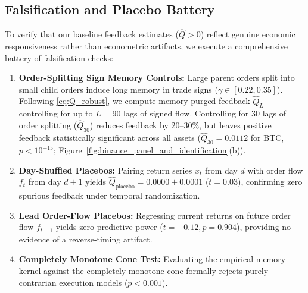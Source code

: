 \documentclass[12pt]{article}
\theoremstyle{definition}
\theoremstyle{remark}
\begin{document}
\subsection{Falsification and Placebo Battery}
To verify that our baseline feedback estimates ($\hat{Q} > 0$) reflect genuine economic responsiveness rather than econometric artifacts, we execute a comprehensive battery of falsification checks:

\begin{enumerate}[noitemsep,topsep=1pt]
    \item \textbf{Order-Splitting Sign Memory Controls:} Large parent orders split into small child orders induce long memory in trade signs ($\gamma \in [0.22, 0.35]$). Following \eqref{eq:Q_robust}, we compute memory-purged feedback $\hat{Q}_L$ controlling for up to $L=90$ lags of signed flow. Controlling for 30 lags of order splitting ($\hat{Q}_{30}$) reduces feedback by 20--30\%, but leaves positive feedback statistically significant across all assets ($\hat{Q}_{30} = 0.0112$ for BTC, $p < 10^{-15}$; Figure~\ref{fig:binance_panel_and_identification}(b)).
    \item \textbf{Day-Shuffled Placebos:} Pairing return series $x_t$ from day $d$ with order flow $f_t$ from day $d+1$ yields $\hat{Q}_{\text{placebo}} = 0.0000 \pm 0.0001$ ($t = 0.03$), confirming zero spurious feedback under temporal randomization.
    \item \textbf{Lead Order-Flow Placebos:} Regressing current returns on future order flow $f_{t+1}$ yields zero predictive power ($t = -0.12, p = 0.904$), providing no evidence of a reverse-timing artifact.
    \item \textbf{Completely Monotone Cone Test:} Evaluating the empirical memory kernel against the completely monotone cone formally rejects purely contrarian execution models ($p < 0.001$).
\end{enumerate}
\end{document}
